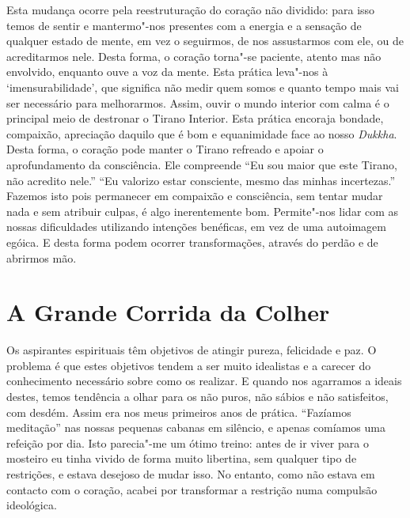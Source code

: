 Esta mudança ocorre pela reestruturação do coração não dividido: para
isso temos de sentir e mantermo"-nos presentes com a energia e a sensação
de qualquer estado de mente, em vez o seguirmos, de nos assustarmos com
ele, ou de acreditarmos nele. Desta forma, o coração torna"-se paciente,
atento mas não envolvido, enquanto ouve a voz da mente. Esta prática
leva"-nos à `imensurabilidade', que significa não medir quem somos e
quanto tempo mais vai ser necessário para melhorarmos. Assim, ouvir o
mundo interior com calma é o principal meio de destronar o Tirano
Interior. Esta prática encoraja bondade, compaixão, apreciação daquilo
que é bom e equanimidade face ao nosso \emph{Dukkha}. Desta forma, o
coração pode manter o Tirano refreado e apoiar o aprofundamento da
consciência. Ele compreende “Eu sou maior que este Tirano, não acredito
nele.” “Eu valorizo estar consciente, mesmo das minhas incertezas.”
Fazemos isto pois permanecer em compaixão e consciência, sem tentar
mudar nada e sem atribuir culpas, é algo inerentemente bom. Permite"-nos
lidar com as nossas dificuldades utilizando intenções benéficas, em vez
de uma autoimagem egóica. E desta forma podem ocorrer transformações,
através do perdão e de abrirmos mão.

\section{A Grande Corrida da Colher}

Os aspirantes espirituais têm objetivos de atingir pureza, felicidade e
paz. O problema é que estes objetivos tendem a ser muito idealistas e a
carecer do conhecimento necessário sobre como os realizar. E quando nos
agarramos a ideais destes, temos tendência a olhar para os não puros,
não sábios e não satisfeitos, com desdém. Assim era nos meus primeiros
anos de prática. “Fazíamos meditação” nas nossas pequenas cabanas em
silêncio, e apenas comíamos uma refeição por dia. Isto parecia"-me um
ótimo treino: antes de ir viver para o mosteiro eu tinha vivido de forma
muito libertina, sem qualquer tipo de restrições, e estava desejoso de
mudar isso. No entanto, como não estava em contacto com o coração,
acabei por transformar a restrição numa compulsão ideológica.

